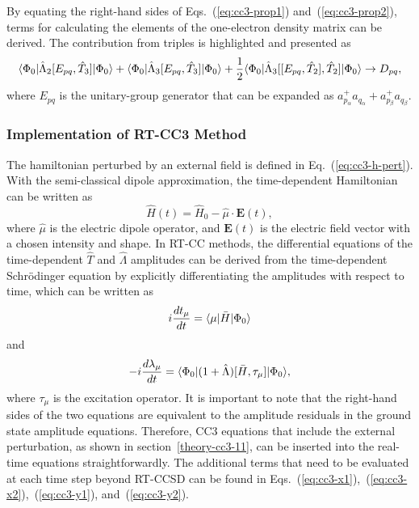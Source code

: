 By equating the right-hand sides of Eqs.~(\ref{eq:cc3-prop1}) and~(\ref{eq:cc3-prop2}), terms for calculating the elements of the one-electron density matrix can be derived. The contribution from triples is highlighted and presented as
\begin{equation}
\langle\Phi_{0} |\hat{\Lambda}_{2}[E_{pq}, \hat{T}_{3}]| \Phi_{0} \rangle + \langle\Phi_{0} |\hat{\Lambda}_{3}[E_{pq}, \hat{T}_{3}]| \Phi_{0} \rangle 
+ \frac{1}{2}\langle\Phi_{0} |\hat{\Lambda}_{3}[[E_{pq}, \hat{T}_{2}], \hat{T}_{2}]| \Phi_{0} \rangle \rightarrow D_{pq},
\label{eq:cc3-opdm}
\end{equation}
where $E_{pq}$ is the unitary-group generator that can be expanded as $a_{p_{\alpha}}^{+}a_{q_{\alpha}} + a_{p_{\beta}}^{+}a_{q_{\beta}}$.

\subsubsection{Implementation of RT-CC3 Method}  \label{theory-cc3-12}
The hamiltonian perturbed by an external field is defined in Eq.~(\ref{eq:cc3-h-pert}). With the semi-classical dipole approximation, the time-dependent Hamiltonian can be written as
\begin{equation}
\hat{H}(t)= \hat{H}_{0} - \hat{\mu} \cdot \textbf{E}(t),
\label{eq:cc3-H-efield}
\end{equation}
where $\hat{\mu}$ is the electric dipole operator, and $\textbf{E}(t)$ is the electric field vector with a chosen intensity and shape. In RT-CC methods, the differential equations of the time-dependent $\hat{T}$ and $\hat{\Lambda}$ amplitudes can be derived from the time-dependent Schr\"odinger equation by explicitly differentiating the amplitudes with respect to time, which can be written as
\begin{equation}
i\frac{dt_{\mu}}{dt} = \langle\mu |\bar{H}| \Phi_{0} \rangle
\label{eq:cc3-rt-t}
\end{equation}
and
\begin{equation}
-i\frac{d\lambda_{\mu}}{dt} = \langle\Phi_{0} |(1+\hat{\Lambda})[\bar{H}, \tau_{\mu}]| \Phi_{0} \rangle,
\label{eq:cc3-rt-l}
\end{equation}
where $\tau_{\mu}$ is the excitation operator. It is important to note that the right-hand sides of the two equations are equivalent to the amplitude residuals in the ground state amplitude equations. Therefore, CC3 equations that include the external perturbation, as shown in section~\ref{theory-cc3-11}, can be inserted into the real-time equations straightforwardly. The additional terms that need to be evaluated at each time step beyond RT-CCSD can be found in Eqs.~(\ref{eq:cc3-x1}),~(\ref{eq:cc3-x2}),~(\ref{eq:cc3-y1}), and~(\ref{eq:cc3-y2}).   

